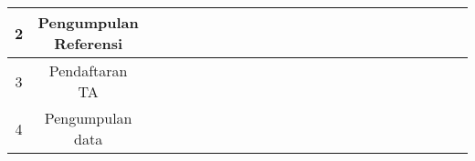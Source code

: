 \documentclass{article}
\begin{document}
\begin{table}
{\begin{tabular}{|c|c|l|l|l|l|l|l|l|l|l|l|l|l|l|l|l|l|l|l|l|l|l|l|}
\hline
2                   & Pengumpulan Referensi                                                      & {\cellcolor[rgb]{0.502,0.502,0.502}} & {\cellcolor[rgb]{0.502,0.502,0.502}} &                                      &                                      &                                      &                                      &                                      &                                      &                                      &                                      &                                      &                                      &                                      &                                      &                                      &                                      &                                      &                                      &                                      &                                      &                                      &                                       \\ 
\hline
3                   & Pendaftaran TA                                                             &                                      & {\cellcolor[rgb]{0.502,0.502,0.502}} &                                      &                                      &                                      &                                      &                                      &                                      &                                      &                                      &                                      &                                      &                                      &                                      &                                      &                                      &                                      &                                      &                                      &                                      &                                      &                                       \\ 
\hline
4                   & Pengumpulan data                                                           & {\cellcolor[rgb]{0.502,0.502,0.502}} & {\cellcolor[rgb]{0.502,0.502,0.502}} & {\cellcolor[rgb]{0.502,0.502,0.502}} & {\cellcolor[rgb]{0.502,0.502,0.502}} & {\cellcolor[rgb]{0.502,0.502,0.502}} & {\cellcolor[rgb]{0.502,0.502,0.502}} & {\cellcolor[rgb]{0.502,0.502,0.502}} & {\cellcolor[rgb]{0.502,0.502,0.502}} & {\cellcolor[rgb]{0.502,0.502,0.502}} & {\cellcolor[rgb]{0.502,0.502,0.502}} &                                      &                                      &                                      &                                      &                                      &                                      &                                      &                                      &                                      &                                      &                                      &                                       \\ 

\end{tabular}}
\end{table}
\end{document}
